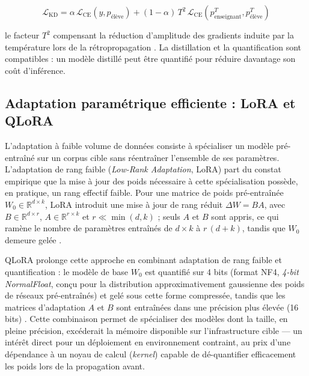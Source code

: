\begin{equation}
    \mathcal{L}_{\mathrm{KD}} = \alpha\, \mathcal{L}_{\mathrm{CE}}(y, p_{\mathrm{\text{élève}}}) + (1-\alpha)\, T^2\, \mathcal{L}_{\mathrm{CE}}(p_{\mathrm{\text{enseignant}}}^{T}, p_{\mathrm{\text{élève}}}^{T})
\end{equation}

le facteur $T^2$ compensant la réduction d'amplitude des gradients induite par la température lors de la rétropropagation \cite{hinton2015distilling}. La distillation et la quantification sont compatibles : un modèle distillé peut être quantifié pour réduire davantage son coût d'inférence.

\subsection{Adaptation paramétrique efficiente : LoRA et QLoRA}
\label{sec:lora-qlora}

L'adaptation à faible volume de données consiste à spécialiser un modèle pré-entraîné sur un corpus cible sans réentraîner l'ensemble de ses paramètres.
L'adaptation de rang faible (\textit{Low-Rank Adaptation}, LoRA) part du constat empirique que la mise à jour des poids nécessaire à cette spécialisation possède, en pratique, un rang effectif faible.
Pour une matrice de poids pré-entraînée $W_0 \in \mathbb{R}^{d \times k}$, LoRA introduit une mise à jour de rang réduit $\Delta W = BA$, avec $B \in \mathbb{R}^{d \times r}$, $A \in \mathbb{R}^{r \times k}$ et $r \ll \min(d,k)$ ; seuls $A$ et $B$ sont appris, ce qui ramène le nombre de paramètres entraînés de $d \times k$ à $r\,(d+k)$, tandis que $W_0$ demeure gelée \cite{hu2022lora}.

QLoRA prolonge cette approche en combinant adaptation de rang faible et
quantification : le modèle de base $W_0$ est quantifié sur 4 bits (format NF4, \textit{4-bit NormalFloat}, conçu pour la distribution approximativement gaussienne des poids de réseaux pré-entraînés) et gelé sous cette forme compressée, tandis que les matrices d'adaptation $A$ et $B$ sont entraînées dans une précision plus élevée (16 bits) \cite{dettmers2023qlora}.
Cette combinaison permet de spécialiser des modèles dont la taille, en pleine précision, excéderait la mémoire disponible sur l'infrastructure cible --- un intérêt direct pour un déploiement en environnement contraint, au prix d'une dépendance à un noyau de calcul (\textit{kernel}) capable de dé-quantifier efficacement les poids lors de la propagation avant.

